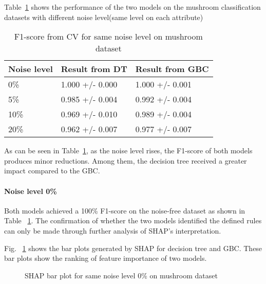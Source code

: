 \documentclass[runningheads,a4paper]{llncs}
\begin{document}
Table~\ref{result from same mushroom} shows the performance of the two models on the mushroom classification datasets with different noise level(same level on each attribute)

\begin{table}[H]
\centering
\caption{F1-score from CV for same noise level on mushroom dataset}
\label{result from same mushroom}
\begin{tabular}{|l|l|l|}
\hline
Noise level & Result from DT  &Result from GBC\\
\hline
0\% & 1.000 +/- 0.000 & 1.000 +/- 0.001 \\
5\% & 0.985 +/- 0.004 & 0.992 +/- 0.004 \\
10\%& 0.969 +/- 0.010 & 0.989 +/- 0.004 \\
20\%& 0.962 +/- 0.007 & 0.977 +/- 0.007 \\
\hline
\end{tabular}
\end{table}

As can be seen in Table~\ref{result from same mushroom}, as the noise level rises, the F1-score of both models produces minor reductions. Among them, the decision tree received a greater impact compared to the GBC.

\paragraph{Noise level 0\%}
Both models achieved a 100\% F1-score on the noise-free dataset as shown in Table ~\ref{result from same mushroom}. The confirmation of whether the two models identified the defined rules can only be made through further analysis of SHAP's interpretation.

Fig. ~\ref{bar plots noise level 0} shows the bar plots generated by SHAP for decision tree and GBC. These bar plots show the ranking of feature importance of two models.
\begin{figure}[H]
	\centering
	
	\hfill
	
	
	\caption{SHAP bar plot for same noise level 0\% on mushroom dataset}
	\label{bar plots noise level 0}
\end{figure}
\end{document}
